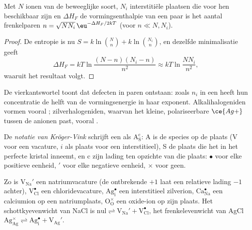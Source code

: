 \begin{proposition}[Frenkeldefecten]\label{prop:b3:solid-state:frenkel}
Met $N$ ionen van de beweeglijke soort, $N_i$ interstitiële plaatsen die voor hen beschikbaar zijn en
$\Delta H_F$ de vormingsenthalpie van een paar is het aantal frenkelparen $n =
\sqrt{NN_i}\,\eu^{-\Delta H_F/2kT}$ (voor $n \ll N, N_i$).
\end{proposition}

\begin{proof}
De entropie is nu $S = k\ln\binom{N}{n} + k\ln\binom{N_i}{n}$, en dezelfde minimalisatie geeft
\[
  \Delta H_F = kT\ln\frac{(N - n)(N_i - n)}{n^2} \approx kT\ln\frac{NN_i}{n^2},
\]
waaruit het resultaat volgt.
\end{proof}

De vierkantswortel toont dat defecten in paren ontstaan: zoals $n_i$ in een 
heeft hun concentratie de helft van de vormingsenergie in haar exponent.
Alkalihalogeniden vormen vooral ; zilverhalogeniden,
waarvan het kleine, polariseerbare
$\ce{Ag+}$ tussen de anionen past, vooral .

\begin{definition}\label{def:b3:solid-state:kroger-vink}
De \emph{notatie van Kröger-Vink}
schrijft een  als $\mathrm{A_S^c}$: A is de species op de plaats (V voor een vacature, $i$ als plaats
voor een interstitieel), S de plaats die het in het perfecte kristal
inneemt, en c zijn lading ten opzichte van die plaats: $\bullet$ voor elke positieve eenheid, $'$ voor elke negatieve
eenheid, $\times$ voor geen.
\end{definition}

Zo is $\mathrm{V_{Na}'}$ een natriumvacature (de ontbrekende $+1$ laat een relatieve lading $-1$ achter),
$\mathrm{V_{Cl}^{\bullet}}$ een chloridevacature, $\mathrm{Ag_i^{\bullet}}$ een interstitieel zilverion, $\mathrm{Ca_{Na}^{\bullet}}$ een calciumion op een
natriumplaats, $\mathrm{O_O^{\times}}$ een oxide-ion op zijn plaats. Het schottkyevenwicht van NaCl is
$\text{nul} \rightleftharpoons \mathrm{V_{Na}' + V_{Cl}^{\bullet}}$, het frenkelevenwicht van AgCl
$\mathrm{Ag_{Ag}^{\times}} \rightleftharpoons \mathrm{Ag_i^{\bullet} + V_{Ag}'}$.

